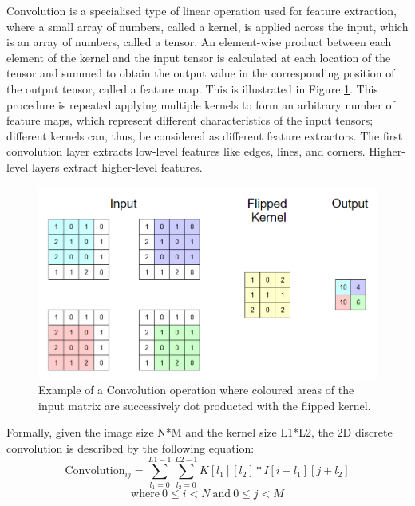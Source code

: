 Convolution is a specialised type of linear operation used for feature extraction, where a small array of numbers, called a kernel, is applied across the input, which is an array of numbers, called a tensor. An element-wise product between each element of the kernel and the input tensor is calculated at each location of the tensor and summed to obtain the output value in the corresponding position of the output tensor, called a feature map. This is illustrated in Figure \ref{Convolution}. This procedure is repeated applying multiple kernels to form an arbitrary number of feature maps, which represent different characteristics of the input tensors; different kernels can, thus, be considered as different feature extractors. The first convolution layer extracts low-level features like edges, lines, and corners. Higher-level layers extract higher-level features. \\

\begin{figure}[H]
  \centering
  \includegraphics[scale = 0.6]{Images/convolution.png}
  \caption{Example of a Convolution operation where coloured areas of the input matrix are successively dot producted with the flipped kernel.}
  \label{Convolution}
\end{figure}

Formally, given the image size N*M and the kernel size L1*L2, the 2D discrete convolution is described by the following equation: \\

\begin{equation}
  \text{Convolution}_{ij} = \sum_{l_1=0}^{L1-1} \sum_{l_2=0}^{L2-1} K[l_1][l_2]*I[i+l_1][j+l_2]
\end{equation}
$$\text{where} \ 0 \leq i < N \ \text{and} \ 0 \leq j < M$$ \\

